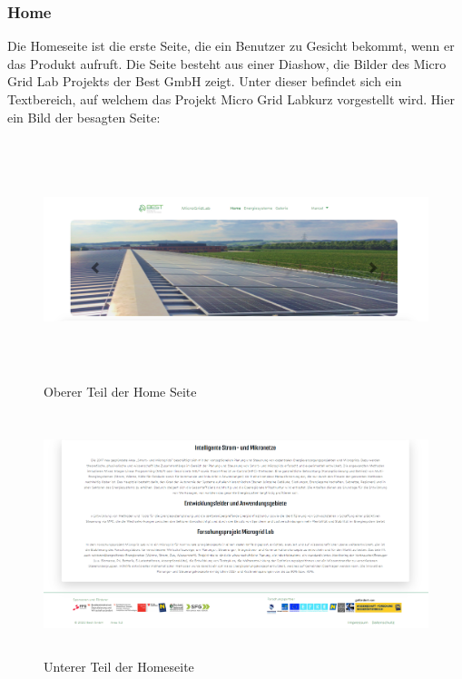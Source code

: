 \subsubsection{Home}
Die Homeseite ist die erste Seite, die ein Benutzer zu Gesicht bekommt, wenn er das Produkt aufruft. Die Seite besteht aus einer Diashow, die Bilder des Micro Grid Lab Projekts der Best GmbH zeigt. Unter dieser befindet sich ein Textbereich, auf welchem das Projekt \glqq Micro Grid Lab\grqq \space kurz vorgestellt wird. Hier ein Bild der besagten Seite:
\begin{figure}[h]
	\centering
	\includegraphics[height=7cm,width=14cm]{images/HomeSeite1}
	\caption{Oberer Teil der Home Seite}
	\label{fig:HomeSeite1}
\end{figure}
\begin{figure}[h]
	\centering
	\includegraphics[height=7cm,width=14cm]{images/HomeSeite2}
	\caption{Unterer Teil der Homeseite}
	\label{fig:HomeSeite1}
\end{figure}
\newpage
